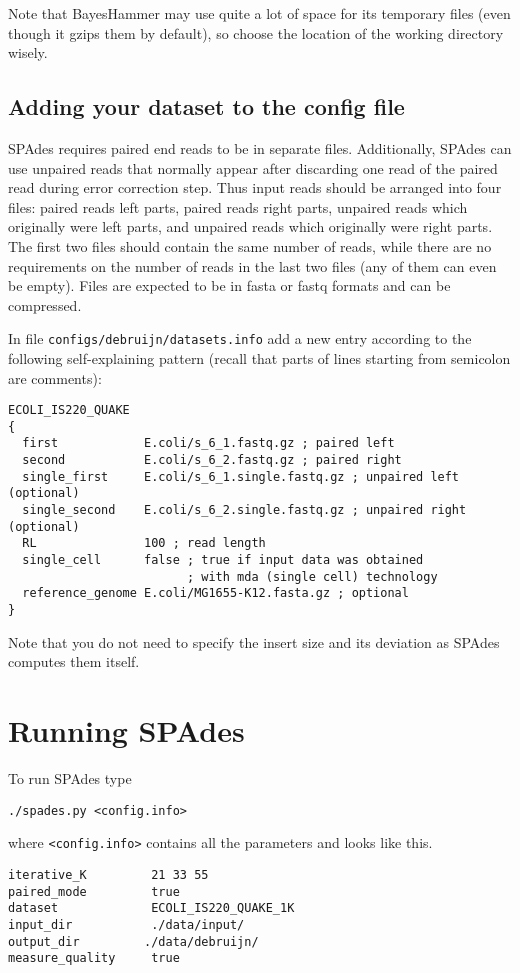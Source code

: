 \documentclass{article}
\def\spades{SPAdes}
\def\bh{BayesHammer}
\begin{document}
Note that {\bh} may use quite a lot of space for its temporary files (even though it gzips them by default), so choose the location
of the working directory wisely.

\subsection{Adding your dataset to the config file}\label{subsec:datasets}
{\spades} requires paired end reads to be in separate files.
Additionally, {\spades} can use unpaired reads that normally appear after discarding one read of the paired read during error correction step.
Thus input reads should be arranged into four files: paired reads left parts, paired reads right parts, unpaired reads which originally were left parts, and
unpaired reads which originally were right parts. The first two files should contain the same number of reads, while
there are no requirements on the number of reads in the last two files (any of them can even be empty).
Files are expected to be in fasta or fastq formats and can be compressed.

In file {\tt configs/debruijn/datasets.info} add a new entry according to the following self-explaining pattern (recall that parts of lines starting from
semicolon are comments):
\begin{lstlisting}
ECOLI_IS220_QUAKE
{
  first            E.coli/s_6_1.fastq.gz ; paired left
  second           E.coli/s_6_2.fastq.gz ; paired right
  single_first     E.coli/s_6_1.single.fastq.gz ; unpaired left (optional)
  single_second    E.coli/s_6_2.single.fastq.gz ; unpaired right (optional)
  RL               100 ; read length
  single_cell      false ; true if input data was obtained 
                         ; with mda (single cell) technology
  reference_genome E.coli/MG1655-K12.fasta.gz ; optional
}
\end{lstlisting}
Note that you do not need to specify the insert size and its deviation as {\spades}
computes them itself.

\section{Running {\spades}}
To run {\spades} type
\begin{lstlisting}
./spades.py <config.info>
\end{lstlisting}
where {\tt <config.info>} contains all the parameters and looks like this.
\begin{lstlisting}
iterative_K         21 33 55
paired_mode         true 
dataset             ECOLI_IS220_QUAKE_1K
input_dir           ./data/input/
output_dir         ./data/debruijn/
measure_quality     true
\end{lstlisting}
\end{document}
